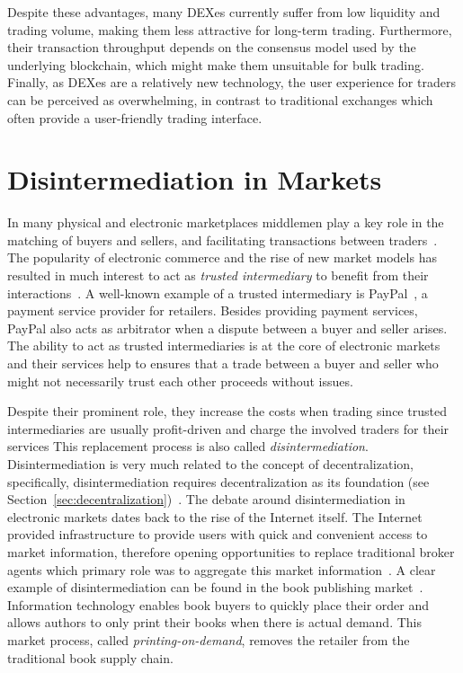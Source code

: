 Despite these advantages, many DEXes currently suffer from low liquidity and trading volume, making them less attractive for long-term trading.
Furthermore, their transaction throughput depends on the consensus model used by the underlying blockchain, which might make them unsuitable for bulk trading.
Finally, as DEXes are a relatively new technology, the user experience for traders can be perceived as overwhelming, in contrast to traditional exchanges which often provide a user-friendly trading interface.

\section{Disintermediation in Markets}
In many physical and electronic marketplaces middlemen play a key role in the matching of buyers and sellers, and facilitating transactions between traders~\cite{bakos1998emerging}.
The popularity of electronic commerce and the rise of new market models has resulted in much interest to act as \emph{trusted intermediary} to benefit from their interactions~\cite{clark1999electronic}.
A well-known example of a trusted intermediary is PayPal~\cite{paypal}, a payment service provider for retailers.
Besides providing payment services, PayPal also acts as arbitrator when a dispute between a buyer and seller arises.
The ability to act as trusted intermediaries is at the core of electronic markets and their services help to ensures that a trade between a buyer and seller who might not necessarily trust each other proceeds without issues.

Despite their prominent role, they increase the costs when trading since trusted intermediaries are usually profit-driven and charge the involved traders for their services
This replacement process is also called \emph{disintermediation}.
Disintermediation is very much related to the concept of decentralization, specifically, disintermediation requires decentralization as its foundation (see Section~\ref{sec:decentralization})~\cite{guo2016blockchain}.
The debate around disintermediation in electronic markets dates back to the rise of the Internet itself. %
The Internet provided infrastructure to provide users with quick and convenient access to market information, therefore opening opportunities to replace traditional broker agents which primary role was to aggregate this market information~\cite{wigand2020whatever}.
A clear example of disintermediation can be found in the book publishing market~\cite{giaglis1999disintermediation}.
Information technology enables book buyers to quickly place their order and allows authors to only print their books when there is actual demand.
This market process, called \emph{printing-on-demand}, removes the retailer from the traditional book supply chain.

